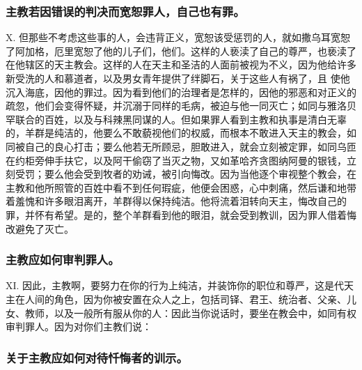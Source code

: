 
\subsubsection{主教若因错误的判决而宽恕罪人，自己也有罪。}

X. 但那些不考虑这些事的人，会违背正义，宽恕该受惩罚的人，就如撒乌耳宽恕了阿加格，厄里宽恕了他的儿子们，他们。这样的人亵渎了自己的尊严，也亵渎了在他辖区的天主教会。这样的人在天主和圣洁的人面前被视为不义，因为他给许多新受洗的人和慕道者，以及男女青年提供了绊脚石，关于这些人有祸了，且 使他沉入海底，因他的罪过。因为看到他们的治理者是怎样的，因他的邪恶和对正义的疏忽，他们会变得怀疑，并沉溺于同样的毛病，被迫与他一同灭亡；如同与雅洛贝罕联合的百姓，以及与科辣黑同谋的人。但如果罪人看到主教和执事是清白无辜的，羊群是纯洁的，他要么不敢藐视他们的权威，而根本不敢进入天主的教会，如同被自己的良心打击；要么他若无所顾忌，胆敢进入，就会立刻被定罪，如同乌匝在约柜旁伸手扶它，以及阿干偷窃了当灭之物，又如革哈齐贪图纳阿曼的银钱，立刻受罚；要么他会受到牧者的劝诫，被引向悔改。因为当他逐个审视整个教会，在主教和他所照管的百姓中看不到任何瑕疵，他便会困惑，心中刺痛，然后谦和地带着羞愧和许多眼泪离开，羊群得以保持纯洁。他将流着泪转向天主，悔改自己的罪，并怀有希望。是的，整个羊群看到他的眼泪，就会受到教训，因为罪人借着悔改避免了灭亡。\par


\subsubsection{主教应如何审判罪人。}

XI. 因此，主教啊，要努力在你的行为上纯洁，并装饰你的职位和尊严，这是代天主在人间的角色，因为你被安置在众人之上，包括司铎、君王、统治者、父亲、儿女、教师，以及一般所有服从你的人：因此当你说话时，要坐在教会中，如同有权审判罪人。因为对你们主教们说：\par


\subsubsection{关于主教应如何对待忏悔者的训示。}

